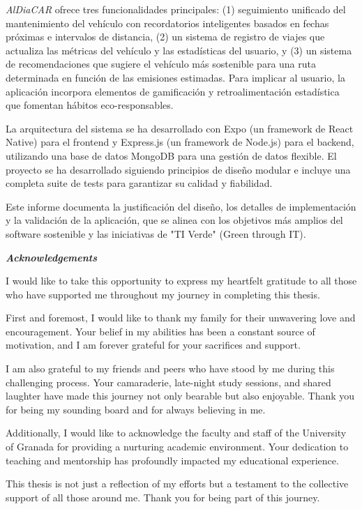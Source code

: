 \textit{AlDiaCAR} ofrece tres funcionalidades principales: (1) seguimiento unificado del mantenimiento del vehículo con recordatorios inteligentes basados en fechas próximas e intervalos de distancia, (2) un sistema de registro de viajes que actualiza las métricas del vehículo y las estadísticas del usuario, y (3) un sistema de recomendaciones que sugiere el vehículo más sostenible para una ruta determinada en función de las emisiones estimadas. Para implicar al usuario, la aplicación incorpora elementos de gamificación y retroalimentación estadística que fomentan hábitos eco-responsables.

\textgap

La arquitectura del sistema se ha desarrollado con Expo (un framework de React Native) para el frontend y Express.js (un framework de Node.js) para el backend, utilizando una base de datos MongoDB para una gestión de datos flexible. El proyecto se ha desarrollado siguiendo principios de diseño modular e incluye una completa suite de tests para garantizar su calidad y fiabilidad.

\textgap

Este informe documenta la justificación del diseño, los detalles de implementación y la validación de la aplicación, que se alinea con los objetivos más amplios del software sostenible y las iniciativas de "TI Verde" (Green through IT).

\newpage


\begin{center}
    \large\bfseries \textit{Acknowledgements}
\end{center}

I would like to take this opportunity to express my heartfelt gratitude to all those who have supported me throughout my journey in completing this thesis.

\textgap

First and foremost, I would like to thank my family for their unwavering love and encouragement. Your belief in my abilities has been a constant source of motivation, and I am forever grateful for your sacrifices and support.

\textgap

I am also grateful to my friends and peers who have stood by me during this challenging process. Your camaraderie, late-night study sessions, and shared laughter have made this journey not only bearable but also enjoyable. Thank you for being my sounding board and for always believing in me.

\textgap

Additionally, I would like to acknowledge the faculty and staff of the University of Granada for providing a nurturing academic environment. Your dedication to teaching and mentorship has profoundly impacted my educational experience.

\textgap

This thesis is not just a reflection of my efforts but a testament to the collective support of all those around me. Thank you for being part of this journey.

\newpage
